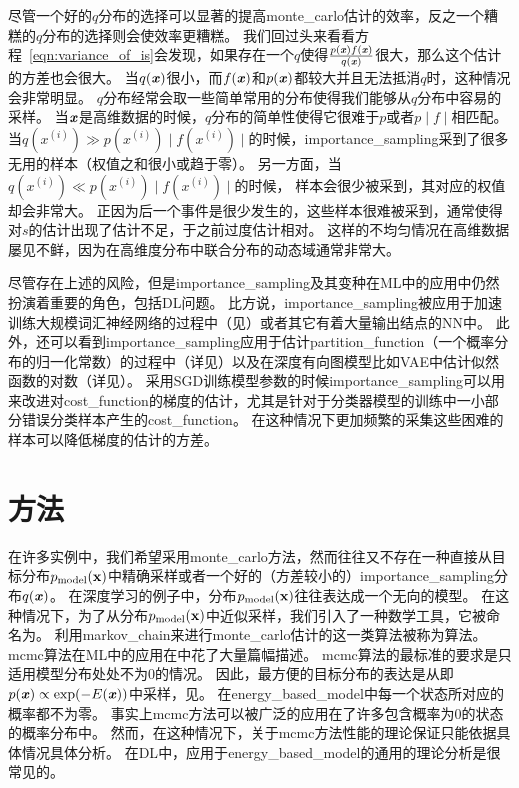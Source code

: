 尽管一个好的$q$分布的选择可以显著的提高\gls{monte_carlo}估计的效率，反之一个糟糕的$q$分布的选择则会使效率更糟糕。
我们回过头来看看方程~\eqref{eqn:variance_of_is}会发现，如果存在一个$q$使得$\frac{p(\boldsymbol{\mathit{x}})f(\boldsymbol{\mathit{x}})}{q(\boldsymbol{\mathit{x}})}$很大，那么这个估计的方差也会很大。
当$q(\boldsymbol{\mathit{x}})$很小，而$f(\boldsymbol{\mathit{x}})$和$p(\boldsymbol{\mathit{x}})$都较大并且无法抵消$q$时，这种情况会非常明显。
$q$分布经常会取一些简单常用的分布使得我们能够从$q$分布中容易的采样。
当$\boldsymbol{\mathit{x}}$是高维数据的时候，$q$分布的简单性使得它很难于$p$或者$p\mid f\mid$相匹配。
当$q(x^{(i)})\gg p(x^{(i)}) \mid f(x^{(i)})\mid $的时候，\gls{importance_sampling}采到了很多无用的样本（权值之和很小或趋于零）。
另一方面，当$q(x^{(i)})\ll p(x^{(i)}) \mid f(x^{(i)})\mid $的时候， 样本会很少被采到，其对应的权值却会非常大。
正因为后一个事件是很少发生的，这些样本很难被采到，通常使得对$s$的估计出现了估计不足，于之前过度估计相对。
这样的不均匀情况在高维数据屡见不鲜，因为在高维度分布中联合分布的动态域通常非常大。

尽管存在上述的风险，但是\gls{importance_sampling}及其变种在\gls{ML}中的应用中仍然扮演着重要的角色，包括\gls{DL}问题。
比方说，\gls{importance_sampling}被应用于加速训练大规模词汇神经网络的过程中（见）或者其它有着大量输出结点的\gls{NN}中。
此外，还可以看到\gls{importance_sampling}应用于估计\gls{partition_function}（一个概率分布的归一化常数）的过程中（详见）以及在深度有向图模型比如\gls{VAE}中估计似然函数的对数（详见）。
采用\gls{SGD}训练模型参数的时候\gls{importance_sampling}可以用来改进对\gls{cost_function}的梯度的估计，尤其是针对于分类器模型的训练中一小部分错误分类样本产生的\gls{cost_function}。
在这种情况下更加频繁的采集这些困难的样本可以降低梯度的估计的方差\citep{Hinton06}。


\section{方法}
\label{sec:markov_chain_monte_carlo_methods}

在许多实例中，我们希望采用\gls{monte_carlo}方法，然而往往又不存在一种直接从目标分布$p_{\text{model}}(\mathbf{x})$中精确采样或者一个好的（方差较小的）\gls{importance_sampling}分布$q(\boldsymbol{\mathit{x}})$。
在深度学习的例子中，分布$p_{\text{model}}(\mathbf{x})$往往表达成一个无向的模型。
在这种情况下，为了从分布$p_{\text{model}}(\mathbf{x})$中近似采样，我们引入了一种数学工具，它被命名为。
利用\gls{markov_chain}来进行\gls{monte_carlo}估计的这一类算法被称为算法。
\gls{mcmc}算法在\gls{ML}中的应用在\citep{koller-book2009}中花了大量篇幅描述。
\gls{mcmc}算法的最标准的要求是只适用模型分布处处不为0的情况。
因此，最方便的目标分布的表达是从即$p(\boldsymbol{\mathit{x}})\propto \exp(-E(\boldsymbol{\mathit{x}}))$中采样，见。
在\gls{energy_based_model}中每一个状态所对应的概率都不为零。
事实上\gls{mcmc}方法可以被广泛的应用在了许多包含概率为0的状态的概率分布中。
然而，在这种情况下，关于\gls{mcmc}方法性能的理论保证只能依据具体情况具体分析。
在\gls{DL}中，应用于\gls{energy_based_model}的通用的理论分析是很常见的。


